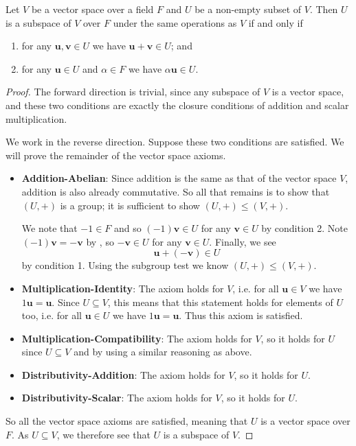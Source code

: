 \begin{theorem}\label{thrm-subspace-test}
    Let $V$ be a vector space over a field $F$ and $U$ be a non-empty subset of $V$. Then $U$ is a subspace of $V$ over $F$ under the same operations as $V$ if and only if
    \begin{enumerate}
        \item for any $\textbf{u}, \textbf{v} \in U$ we have $\textbf{u} + \textbf{v} \in U$; and
        \item for any $\textbf{u} \in U$ and $\alpha \in F$ we have $\alpha\textbf{u} \in U$.
    \end{enumerate}
\end{theorem}
\begin{proof}
    The forward direction is trivial, since any subspace of $V$ is a vector space, and these two conditions are exactly the closure conditions of addition and scalar multiplication.

    We work in the reverse direction. Suppose these two conditions are satisfied. We will prove the remainder of the vector space axioms.
    \begin{itemize}
        \item \textbf{Addition-Abelian}: Since addition is the same as that of the vector space $V$, addition is also already commutative. So all that remains is to show that $(U, +)$ is a group; it is sufficient to show $(U, +) \leq (V, +)$.

        We note that $-1 \in F$ and so $(-1)\textbf{v} \in U$ for any $\textbf{v} \in U$ by condition 2. Note $(-1)\textbf{v} = -\textbf{v}$ by , so $-\textbf{v} \in U$ for any $\textbf{v} \in U$. Finally, we see
        \[
            \textbf{u} + (-\textbf{v}) \in U
        \]
        by condition 1. Using the subgroup test we know $(U, +) \leq (V, +)$.

        \item \textbf{Multiplication-Identity}: The axiom holds for $V$, i.e. for all $\textbf{u} \in V$ we have $1\textbf{u} = \textbf{u}$. Since $U \subseteq V$, this means that this statement holds for elements of $U$ too, i.e. for all $\textbf{u} \in U$ we have $1\textbf{u} = \textbf{u}$. Thus this axiom is satisfied.

        \item \textbf{Multiplication-Compatibility}: The axiom holds for $V$, so it holds for $U$ since $U \subseteq V$ and by using a similar reasoning as above.

        \item \textbf{Distributivity-Addition}: The axiom holds for $V$, so it holds for $U$.

        \item \textbf{Distributivity-Scalar}: The axiom holds for $V$, so it holds for $U$.
    \end{itemize}
    So all the vector space axioms are satisfied, meaning that $U$ is a vector space over $F$. As $U \subseteq V$, we therefore see that $U$ is a subspace of $V$.
\end{proof}
